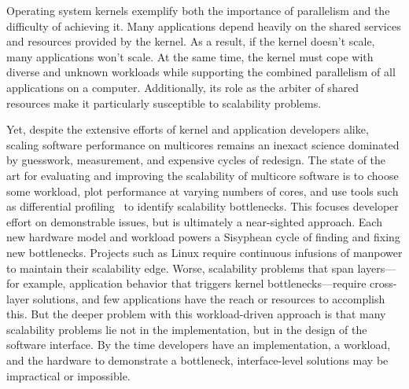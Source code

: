 Operating system kernels exemplify both the importance
of parallelism and the difficulty of achieving it.
%
Many applications depend heavily on the shared services and resources
provided by the kernel.
%
As a result, if the kernel doesn't scale, many applications won't
scale.
%
At the same time, the kernel must cope with diverse and unknown
workloads while supporting the combined parallelism of all
applications on a computer.  Additionally, its role as the arbiter of
shared resources make it particularly susceptible to scalability
problems.
%
%

Yet, despite the extensive efforts of kernel and application
developers alike, scaling software performance on multicores remains
an inexact science dominated by guesswork, measurement, and expensive
cycles of redesign.
%
The state of the art for evaluating and improving the scalability of
multicore software is to choose some workload, plot performance at
varying numbers of cores, and use tools such as differential
profiling~\cite{mckenney:differential} to identify scalability
bottlenecks.
%
This focuses developer effort on demonstrable issues, but is
ultimately a near-sighted approach.
%
%
Each new hardware model and workload powers a Sisyphean cycle of
finding and fixing new bottlenecks.
%
Projects such as Linux require continuous infusions of manpower to
maintain their scalability edge.
%
Worse, scalability problems that span layers---for example,
application behavior that triggers kernel bottlenecks---require
cross-layer solutions, and few applications have the reach or
resources to accomplish this.
%
But the deeper problem with this workload-driven approach is that many
scalability problems lie not in the implementation, but in the design
of the
software interface.  By the time developers have an implementation, a
workload, and the hardware to demonstrate a bottleneck,
interface-level solutions may be impractical or impossible.

